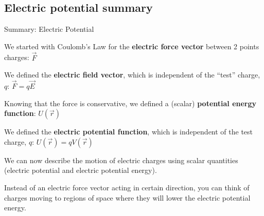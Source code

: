 \documentclass[aspectratio=169,
hyperref={colorlinks,urlcolor=blue}
]{beamer}
\begin{document}




\subsection{Electric potential summary}
\label{subsec:electricpotentialsummary}
\begin{bulletframe}{Summary: Electric Potential}
 \item We started with Coulomb’s Law for the \textbf{electric force vector} between 2 points charges: $\vec F$
 \item We defined the \textbf{electric field vector}, which is independent of the ``test'' charge, $q$: $\vec F=q\vec E$
 \item Knowing that the force is conservative, we defined a (scalar) \textbf{potential energy function}: $U(\vec r)$
 \item We defined the \textbf{electric potential function}, which is independent of the test charge, $q$: $U(\vec r) = q V(\vec r)$
 \item[$\rightarrow$] We can now describe the motion of electric charges using scalar quantities (electric potential and electric potential energy).
 \item[$\rightarrow$] Instead of an electric force vector acting in certain direction, you can think of charges moving to regions of space where they will lower the electric potential energy.
\end{bulletframe}





\end{document}
